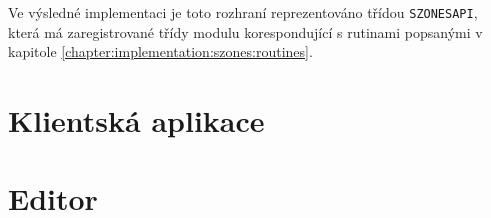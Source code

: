 Ve výsledné implementaci je toto rozhraní reprezentováno třídou \verb|SZONESAPI|, která má zaregistrované třídy modulu korespondující
s rutinami popsanými v kapitole \ref{chapter:implementation:szones:routines}.
\section{Klientská aplikace}
\section{Editor}